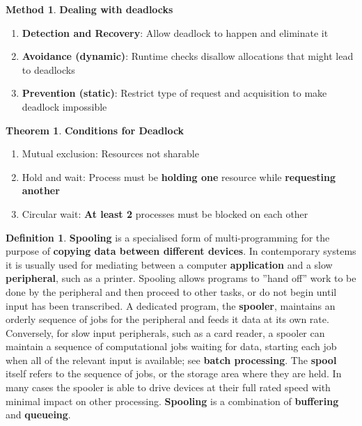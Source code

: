 \documentclass[11pt,a4paper]{article}
\theoremstyle{definition}
\newtheorem{theorem}{Theorem}[section]
\newtheorem{definition}{Definition}[section]
\newtheorem{method}{Method}[section]
\newenvironment{myenumerate}
{ \begin{enumerate}
    \setlength{\itemsep}{5pt}
    \setlength{\parskip}{0pt}
    \setlength{\parsep}{0pt}     }
{ \end{enumerate}                }
\begin{document}
\begin{method}{\textbf{Dealing with deadlocks}}
	\begin{myenumerate}
		\item \textbf{Detection and Recovery}: Allow deadlock to happen and eliminate it
		\item \textbf{Avoidance (dynamic)}: Runtime checks disallow allocations that might lead to deadlocks
		\item \textbf{Prevention (static)}: Restrict type of request and acquisition to make deadlock impossible
	\end{myenumerate}
\end{method}

\begin{theorem}{\textbf{Conditions for Deadlock}}
	\begin{myenumerate}
		\item Mutual exclusion: Resources not sharable
		\item Hold and wait: Process must be \textbf{holding one} resource while \textbf{requesting another}
		\item Circular wait: \textbf{At least 2} processes must be blocked on each other
	\end{myenumerate}
\end{theorem}

\begin{definition}{\textbf{Spooling}}
	is a specialised form of multi-programming for the purpose of \textbf{copying data between different devices}. In contemporary systems it is usually used for mediating between a computer \textbf{application} and a slow \textbf{peripheral}, such as a printer. Spooling allows programs to ''hand off'' work to be done by the peripheral and then proceed to other tasks, or do not begin until input has been transcribed. A dedicated program, the \textbf{spooler}, maintains an orderly sequence of jobs for the peripheral and feeds it data at its own rate. Conversely, for slow input peripherals, such as a card reader, a spooler can maintain a sequence of computational jobs waiting for data, starting each job when all of the relevant input is available; see \textbf{batch processing}. The \textbf{spool} itself refers to the sequence of jobs, or the storage area where they are held. In many cases the spooler is able to drive devices at their full rated speed with minimal impact on other processing. \textbf{Spooling} is a combination of \textbf{buffering} and \textbf{queueing}.
\end{definition}
\end{document}
